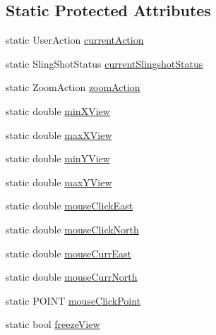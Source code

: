 \subsection*{Static Protected Attributes}
\begin{DoxyCompactItemize}
\item 
static UserAction \hyperlink{class_mosaic_base_a4eced8c64162103aec35721994c4ea17}{currentAction}
\item 
static SlingShotStatus \hyperlink{class_mosaic_base_afa06f2fefb998724242cd4cb6e826a36}{currentSlingshotStatus}
\item 
static ZoomAction \hyperlink{class_mosaic_base_afb5a97e1bb4327d259143054c3a95c41}{zoomAction}
\item 
static double \hyperlink{class_mosaic_base_a7fa3598e3deadf8a5f501ef8d7469d1c}{minXView}
\item 
static double \hyperlink{class_mosaic_base_ab0d0a72f9f9028e90d92b059f60b7a5e}{maxXView}
\item 
static double \hyperlink{class_mosaic_base_abb0507d536e6e7c01ef631a2aa31bd66}{minYView}
\item 
static double \hyperlink{class_mosaic_base_a55f96772dbfa0f25143a2927bbb12688}{maxYView}
\item 
static double \hyperlink{class_mosaic_base_a3912a0636e2b6f62a841deddb077fc4e}{mouseClickEast}
\item 
static double \hyperlink{class_mosaic_base_a1e81373afe810ac058ae8ef28dd12b16}{mouseClickNorth}
\item 
static double \hyperlink{class_mosaic_base_a12652beb1b47d423245ff09bf57a1161}{mouseCurrEast}
\item 
static double \hyperlink{class_mosaic_base_a6c6508870f5713bbccb1363e6795c27d}{mouseCurrNorth}
\item 
static POINT \hyperlink{class_mosaic_base_a9ece442dc14d54587bdbc3dabdace5c2}{mouseClickPoint}
\item 
\hypertarget{class_mosaic_base_a8603449b7a419aee0ec6067e2e3836a0}{
static bool \hyperlink{class_mosaic_base_a8603449b7a419aee0ec6067e2e3836a0}{freezeView}}
\label{class_mosaic_base_a8603449b7a419aee0ec6067e2e3836a0}


\end{DoxyCompactItemize}

